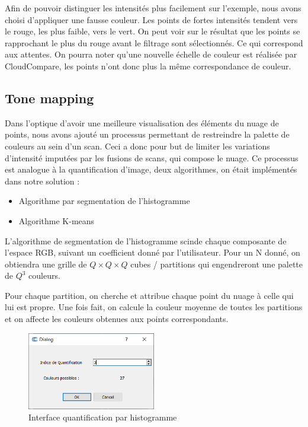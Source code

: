 \documentclass[12pt,titlepage,french]{article}
\begin{document}
Afin de pouvoir distinguer les intensités plus facilement sur l'exemple, nous avons choisi d'appliquer une fausse couleur. Les points de fortes intensités tendent vers le rouge, les plus faible, vers le vert. On peut voir sur le résultat que les points se rapprochant le plus du rouge avant le filtrage sont sélectionnés. Ce qui correspond aux attentes. On pourra noter qu'une nouvelle échelle de couleur est réalisée par CloudCompare, les points n'ont donc plus la même correspondance de couleur.

\subsection{Tone mapping}

Dans l'optique d'avoir une meilleure visualisation des éléments du nuage de points, nous avons ajouté un processus permettant de restreindre la palette de couleurs au sein d'un scan. Ceci a donc pour but de limiter les variations d'intensité imputées par les fusions de scans, qui compose le nuage. Ce processus est analogue à la quantification d'image, deux algorithmes, on était implémentés dans notre solution :

\begin{itemize}
    \item Algorithme par segmentation de l'histogramme
    \item Algorithme K-means
\end{itemize}

L'algorithme de segmentation de l'histogramme scinde chaque composante de l'espace RGB, suivant un coefficient donné par l'utilisateur.
Pour un N donné, on obtiendra une grille de $Q\times Q \times Q$ cubes / partitions qui engendreront une palette de $Q^3$ couleurs.
\newline

Pour chaque partition, on cherche et attribue chaque point du nuage à celle qui lui est propre. Une fois fait,
on calcule la couleur moyenne de toutes les partitions et on affecte les couleurs obtenues aux points correspondants.
\newline

 \begin{figure}[H]
\center
\includegraphics[width=0.5\textwidth]{./img/HistogramDialog.png}
\caption{\label{ui_tonemapping} Interface quantification par histogramme}
\end{figure}
\end{document}
